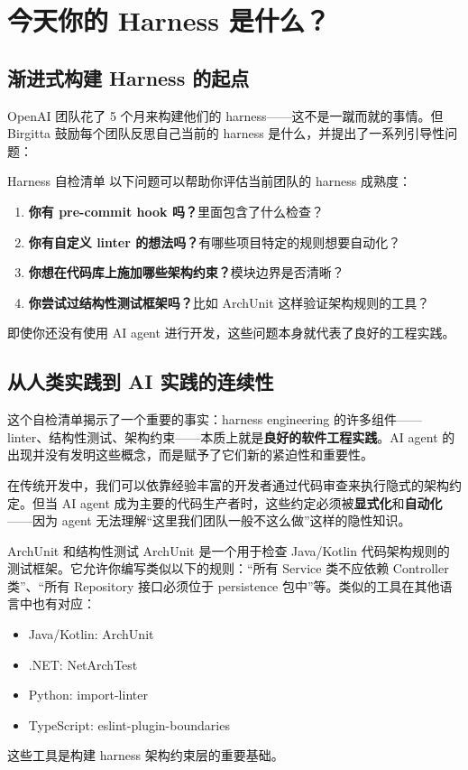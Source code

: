 \section{今天你的 Harness 是什么？}

\subsection{渐进式构建 Harness 的起点}

OpenAI 团队花了 5 个月来构建他们的 harness------这不是一蹴而就的事情。但 Birgitta 鼓励每个团队反思自己当前的 harness 是什么，并提出了一系列引导性问题：

\begin{importantbox}{Harness 自检清单}
以下问题可以帮助你评估当前团队的 harness 成熟度：
\begin{enumerate}[leftmargin=1.5em]
    \item \textbf{你有 pre-commit hook 吗？}里面包含了什么检查？
    \item \textbf{你有自定义 linter 的想法吗？}有哪些项目特定的规则想要自动化？
    \item \textbf{你想在代码库上施加哪些架构约束？}模块边界是否清晰？
    \item \textbf{你尝试过结构性测试框架吗？}比如 ArchUnit 这样验证架构规则的工具？
\end{enumerate}
即使你还没有使用 AI agent 进行开发，这些问题本身就代表了良好的工程实践。
\end{importantbox}

\subsection{从人类实践到 AI 实践的连续性}

这个自检清单揭示了一个重要的事实：harness engineering 的许多组件------linter、结构性测试、架构约束------本质上就是\textbf{良好的软件工程实践}。AI agent 的出现并没有发明这些概念，而是赋予了它们新的紧迫性和重要性。

在传统开发中，我们可以依靠经验丰富的开发者通过代码审查来执行隐式的架构约定。但当 AI agent 成为主要的代码生产者时，这些约定必须被\textbf{显式化}和\textbf{自动化}------因为 agent 无法理解``这里我们团队一般不这么做''这样的隐性知识。

\begin{knowledgebox}{ArchUnit 和结构性测试}
ArchUnit 是一个用于检查 Java/Kotlin 代码架构规则的测试框架。它允许你编写类似以下的规则：``所有 Service 类不应依赖 Controller 类''、``所有 Repository 接口必须位于 persistence 包中''等。类似的工具在其他语言中也有对应：
\begin{itemize}[leftmargin=1.5em]
    \item Java/Kotlin: ArchUnit
    \item .NET: NetArchTest
    \item Python: import-linter
    \item TypeScript: eslint-plugin-boundaries
\end{itemize}
这些工具是构建 harness 架构约束层的重要基础。
\end{knowledgebox}

